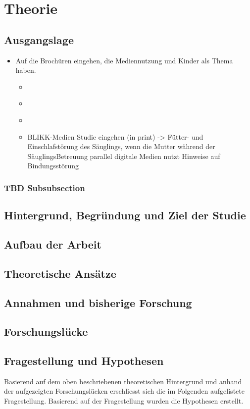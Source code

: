 \section{Theorie}
\subsection{Ausgangslage}
\begin{itemize}
    \item Auf die Brochüren eingehen, die Mediennutzung und Kinder als Thema haben.
    \begin{itemize}
        \item \cite{Weber2017}
        \item \cite{MariaLuisaNuesch2017}
        \item \cite{Elternbildung2017}
        \item BLIKK-Medien Studie eingehen (in print) -> Fütter- und Einschlafstörung des Säuglings, wenn die Mutter während der SäuglingsBetreuung parallel digitale Medien nutzt Hinweise auf Bindungsstörung
    \end{itemize}
\end{itemize}
\subsubsection{TBD Subsubsection}
\subsection{Hintergrund, Begründung und Ziel der Studie}
\subsection{Aufbau der Arbeit}
\subsection{Theoretische Ansätze}
\subsection{Annahmen und bisherige Forschung}
\subsection{Forschungslücke}
\subsection{Fragestellung und Hypothesen}
Basierend auf dem oben beschriebenen theoretischen Hintergrund und anhand der aufgezeigten Forschungslücken erschliesst sich die im Folgenden aufgelistete Fragestellung. Basierend auf der Fragestellung wurden die Hypothesen erstellt.
